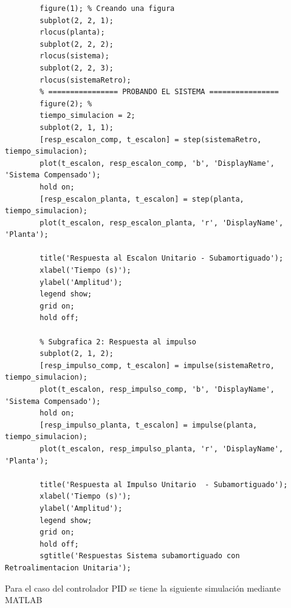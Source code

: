 \documentclass[conference]{IEEEtran}
\begin{document}
\begin{lstlisting}[numbers=none, caption={Controlador PD}]
		% Dibujando el LGR del sistema a lazo abierto
		figure(1); % Creando una figura
		subplot(2, 2, 1);
		rlocus(planta);
		subplot(2, 2, 2);
		rlocus(sistema);
		subplot(2, 2, 3);
		rlocus(sistemaRetro);
		% ================ PROBANDO EL SISTEMA ================
		figure(2); %
		tiempo_simulacion = 2;
		subplot(2, 1, 1);
		[resp_escalon_comp, t_escalon] = step(sistemaRetro, tiempo_simulacion);
		plot(t_escalon, resp_escalon_comp, 'b', 'DisplayName', 'Sistema Compensado');
		hold on;
		[resp_escalon_planta, t_escalon] = step(planta, tiempo_simulacion);
		plot(t_escalon, resp_escalon_planta, 'r', 'DisplayName', 'Planta');
		
		title('Respuesta al Escalon Unitario - Subamortiguado');
		xlabel('Tiempo (s)');
		ylabel('Amplitud');
		legend show;
		grid on; 
		hold off;
		
		% Subgrafica 2: Respuesta al impulso 
		subplot(2, 1, 2); 
		[resp_impulso_comp, t_escalon] = impulse(sistemaRetro, tiempo_simulacion);
		plot(t_escalon, resp_impulso_comp, 'b', 'DisplayName', 'Sistema Compensado');
		hold on;
		[resp_impulso_planta, t_escalon] = impulse(planta, tiempo_simulacion);
		plot(t_escalon, resp_impulso_planta, 'r', 'DisplayName', 'Planta');
		
		title('Respuesta al Impulso Unitario  - Subamortiguado');
		xlabel('Tiempo (s)');
		ylabel('Amplitud'); 
		legend show;
		grid on; 
		hold off;
		sgtitle('Respuestas Sistema subamortiguado con Retroalimentacion Unitaria');
	\end{lstlisting}
	
	Para el caso del controlador PID se tiene la siguiente simulación mediante MATLAB
	
\end{document}
